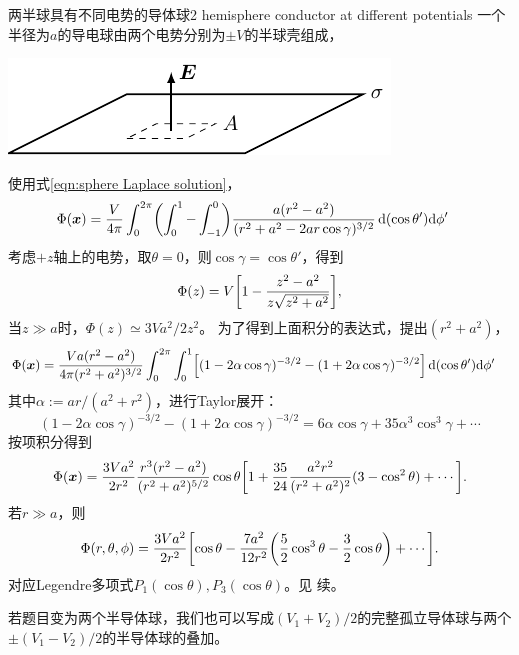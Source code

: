 \begin{example}{两半球具有不同电势的导体球}{2 hemisphere conductor at different potentials}
    一个半径为$a$的导电球由两个电势分别为$\pm V$的半球壳组成，
    \begin{center}
        \includegraphics[page=10]{figures/tikz/layouts.pdf}
        \label{fig:2 hemisphere}
    \end{center}
    使用式\eqref{eqn:sphere Laplace solution}，
    \begin{align*}
        \Phi(\bm x)&=\frac V{4\pi}\int_0^{2\pi}\biggkh{\int_0^1-\int_{-1}^0}\frac{a(r^2-a^2)}{(r^2+a^2-2ar\cos\gamma)^{3/2}}\d(\cos\theta')\nd\phi'%
    \end{align*}
    考虑$+z$轴上的电势，取$\theta=0$，则$\cos\gamma=\cos\theta'$，得到 
    \begin{equation}
        \Phi(z)=V\biggl[1-\frac{z^2-a^2}{z\sqrt{z^2+a^2}}\biggr],
    \end{equation}
    当$z\gg a$时，$\Phi(z)\simeq 3Va^2/2z^2$。
    \tcblower
    为了得到上面积分的表达式，提出$(r^2+a^2)$，
    \begin{align*}
        \Phi(\bm x)&=\frac{Va(r^2-a^2)}{4\pi(r^2+a^2)^{3/2}}\int_0^{2\pi}\int_0^1\Bigl[(1-2\alpha\cos\gamma)^{-3/2}-(1+2\alpha\cos\gamma)^{-3/2}\Bigr]\mathop{}\!\mathrm{d}(\cos\theta')\mathrm{d}\phi'
    \end{align*}
    其中$\alpha:=ar/(a^2+r^2)$，进行Taylor展开：
    \[
        (1-2\alpha\cos\gamma)^{-3/2}-(1+2\alpha\cos\gamma)^{-3/2}=6\alpha\cos\gamma+35\alpha^3\cos^3\gamma+\cdots
    \]
    按项积分得到
    \[
        \Phi(\bm x)=\frac{3Va^2}{2r^2}\frac{r^3(r^2-a^2)}{(r^2+a^2)^{5/2}}\cos\theta\biggl[1+\frac{35}{24}\frac{a^2r^2}{(r^2+a^2)^2}(3-\cos^2\theta)+\cdots\biggr].
    \]
    若$r\gg a$，则
    \begin{equation}
        \Phi(r,\theta,\phi)=\frac{3Va^2}{2r^2}\biggl[\cos\theta-\frac{7a^2}{12r^2}\biggl(\frac52\cos^3\theta-\frac32\cos\theta\biggr)+\cdots\biggr].
    \end{equation}
    对应Legendre多项式$P_1(\cos\theta),P_3(\cos\theta)$。见 续。
\end{example}
\begin{remark}
    若题目变为两个半导体球，我们也可以写成$(V_1+V_2)/2$的完整孤立导体球与两个$\pm(V_1-V_2)/2$的半导体球的叠加。
\end{remark}

